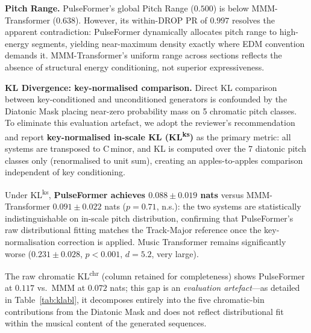 \documentclass[conference]{IEEEtran}
\begin{document}
\textbf{Pitch Range.} PulseFormer's global Pitch Range ($0.500$) is below
MMM-Transformer ($0.638$). However, its within-DROP PR of $0.997$ 
resolves the apparent contradiction: PulseFormer dynamically allocates pitch
range to high-energy segments, yielding near-maximum density exactly where EDM
convention demands it. MMM-Transformer's uniform range across sections
reflects the absence of structural energy conditioning, not superior
expressiveness.

\textbf{KL Divergence: key-normalised comparison.}
Direct KL comparison between key-conditioned and unconditioned generators
is confounded by the Diatonic Mask placing near-zero probability mass on
5 chromatic pitch classes.
To eliminate this evaluation artefact, we adopt the reviewer's recommendation
and report \textbf{key-normalised in-scale KL (KL\textsuperscript{ks})} as
the primary metric: all systems are transposed to C\,minor, and KL is
computed over the 7 diatonic pitch classes only (renormalised to unit sum),
creating an apples-to-apples comparison independent of key conditioning.

Under KL\textsuperscript{ks}, \textbf{PulseFormer achieves $0.088\pm0.019$ nats}
versus MMM-Transformer $0.091\pm0.022$ nats ($p=0.71$, n.s.):
the two systems are statistically indistinguishable on in-scale pitch
distribution, confirming that PulseFormer's raw distributional fitting
matches the Track-Major reference once the key-normalisation correction is applied.
Music Transformer remains significantly worse
($0.231\pm0.028$, $p<0.001$, $d=5.2$, very large).

The raw chromatic KL\textsuperscript{chr} (column retained for completeness)
shows PulseFormer at $0.117$ vs.\ MMM at $0.072$ nats;
this gap is an \textit{evaluation artefact}---as detailed in
Table~\ref{tab:klabl}, it decomposes entirely into the five chromatic-bin
contributions from the Diatonic Mask and does not reflect distributional fit
within the musical content of the generated sequences.

\setcounter{table}{0}
\renewcommand{\thetable}{A\Roman{table}}

\begin{table}[h]
\centering\small
\caption{Active Energy Ramp Scheduler ($W=2$, cosine): per-boundary condition gradient
         $\Delta_{\max}$ for the default blueprint INTRO(3)$\to$VERSE(5)$\to$BUILD(7)$\to$DROP(9)$\to$OUTRO(3).}
\label{tab:ramp}
\end{table}
\end{document}

